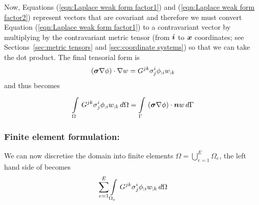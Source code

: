 Now, Equations (\ref{eqn:Laplace weak form factor1}) and (\ref{eqn:Laplace weak form factor2})
represent vectors that are covariant and
therefore we must convert Equation (\ref{eqn:Laplace weak form factor1})
to a contravariant vector by 
multiplying by the contravariant metric tensor (from $\vect{i}$ to $\vect{x}$ 
coordinates; see Sections~\ref{sec:metric tensors} and \ref{sec:coordinate systems})
so that we can take the dot product. The final tensorial form is
\begin{equation}
  \left( \boldsymbol{\sigma}\nabla \phi \right)\cdot\nabla w = G^{jk}\sigma^{i}_{j} {\phi}_{;i}  {w}_{;k} 
\end{equation}
and thus  becomes
\begin{equation}
  \gint{\Omega}{}{G^{jk}\sigma^{i}_{j}\covarderiv{\phi}{i}\covarderiv{w}{k}}{\Omega}
  = \gint{\Gamma}{}{\dotprod{\pbrac{\tensor{\sigma}\gradient{\phi}}}{\vect{n}w}}{\Gamma}
  \label{eqn:Laplaceweightedresidualtensorform}
\end{equation}

\subsubsection{Finite element formulation:}
We can now discretise the domain into finite elements \ie $\Omega=
\displaystyle{\bigcup_{e=1}^{E}}\Omega_{e}$, the left hand side of
 becomes
\begin{equation}
  \displaystyle\sum_{e=1}^{E}  \displaystyle\int\limits_{\Omega_{e}}^{} \,G^{jk}\sigma^{i}_{j} {\phi}_{;i}  {w}_{;k} \,d\Omega 
\end{equation}

